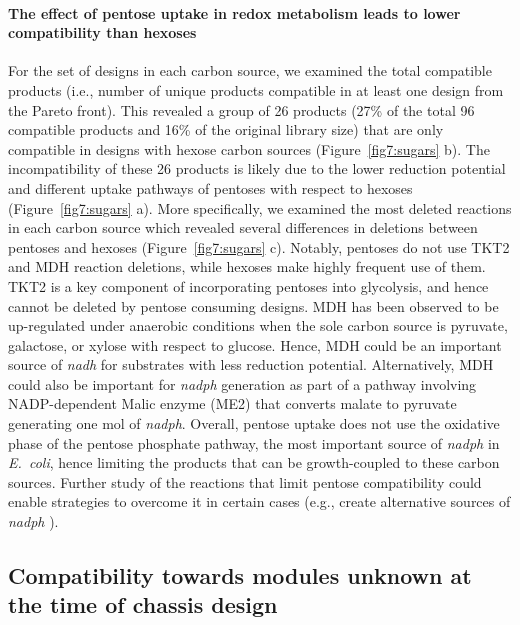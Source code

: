 \documentclass[12pt]{article}
\begin{document}
{\paragraph{The effect of pentose uptake in redox metabolism leads to lower compatibility than hexoses}
For the set of designs in each carbon source, we examined the total compatible products (i.e., number of unique products compatible in at least one design from the Pareto front).
This revealed a group of 26 products (27\% of the total 96 compatible products and 16\% of the original library size) that are only compatible in designs with hexose carbon sources  (Figure~\ref{fig7:sugars} b).
The incompatibility of these 26 products is likely due to the
 lower reduction potential and different uptake pathways of pentoses with respect to hexoses (Figure~\ref{fig7:sugars} a).
More specifically, we examined the most deleted reactions in each carbon source which revealed several differences in deletions between pentoses and hexoses (Figure~\ref{fig7:sugars} c).
Notably, pentoses do not use TKT2 and MDH reaction deletions, while hexoses make highly frequent use of them.
TKT2 is a key component of incorporating pentoses into glycolysis, and hence cannot be deleted by pentose consuming designs.
MDH  has been observed to be up-regulated under anaerobic conditions when the sole carbon source is pyruvate, galactose, or xylose with respect to glucose.\citep{park1995}
Hence, MDH could be an important source of \textit{nadh} for substrates with less reduction potential. %
Alternatively, MDH could also be important for \textit{nadph} generation as part of a pathway involving NADP-dependent Malic enzyme (ME2) that converts malate to pyruvate generating one mol of \textit{nadph}.
Overall, pentose uptake does not use the oxidative phase of the pentose phosphate pathway, the most important source of \textit{nadph} in \textit{E.~coli},\citep{christodoulou2018}
hence limiting the products that can be growth-coupled to these carbon sources.
Further study of the reactions that limit pentose compatibility could enable strategies to overcome it in certain cases (e.g., create alternative sources of \textit{nadph} \citep{lee2013, ng2015c}).


\subsection{Compatibility towards modules unknown at the time of chassis design}

}
\end{document}

